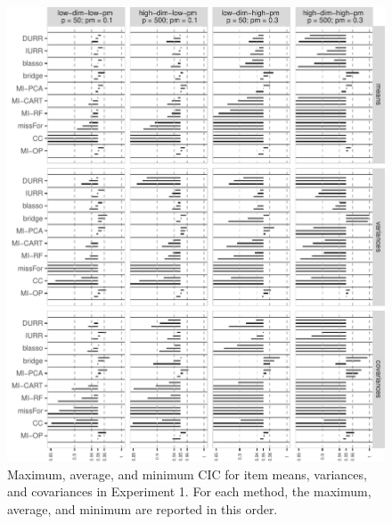 \begin{figure}
\centering
\includegraphics{../../output/graphs/exp1_CI_summy.pdf}
\caption{\label{fig:exp1cir}
	Maximum, average, and minimum CIC for item means, variances, and covariances in Experiment 1.
	For each method, the maximum, average, and minimum are reported in this order.
	}
\end{figure}
	

